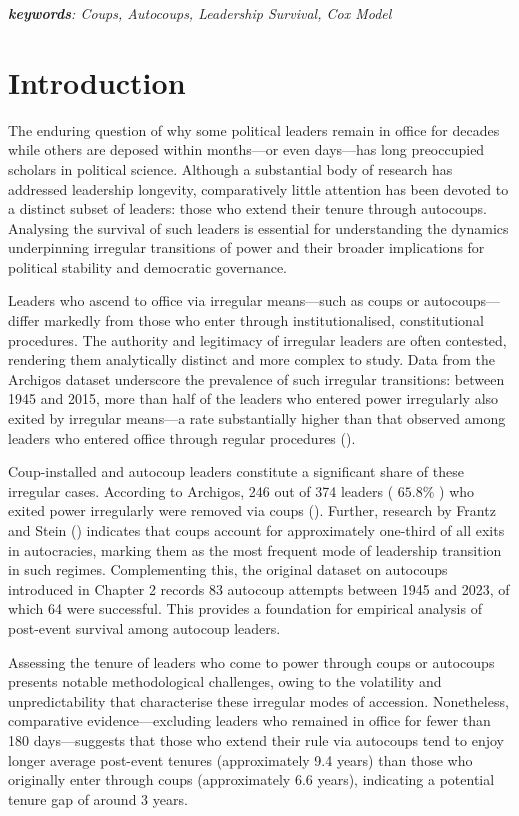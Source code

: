 \documentclass[
  12pt,
]{report}
\begin{document}
\emph{\textbf{keywords}: Coups, Autocoups, Leadership Survival, Cox
Model}

\newpage

\section{Introduction}\label{introduction-3}

The enduring question of why some political leaders remain in office for
decades while others are deposed within months---or even days---has long
preoccupied scholars in political science. Although a substantial body
of research has addressed leadership longevity, comparatively little
attention has been devoted to a distinct subset of leaders: those who
extend their tenure through autocoups. Analysing the survival of such
leaders is essential for understanding the dynamics underpinning
irregular transitions of power and their broader implications for
political stability and democratic governance.

Leaders who ascend to office via irregular means---such as coups or
autocoups---differ markedly from those who enter through
institutionalised, constitutional procedures. The authority and
legitimacy of irregular leaders are often contested, rendering them
analytically distinct and more complex to study. Data from the Archigos
dataset underscore the prevalence of such irregular transitions: between
1945 and 2015, more than half of the leaders who entered power
irregularly also exited by irregular means---a rate substantially higher
than that observed among leaders who entered office through regular
procedures ().

Coup-installed and autocoup leaders constitute a significant share of
these irregular cases. According to Archigos, 246 out of 374 leaders (
\(65.8\%\) ) who exited power irregularly were removed via coups
().
Further, research by Frantz and Stein ()
indicates that coups account for approximately one-third of all exits in
autocracies, marking them as the most frequent mode of leadership
transition in such regimes. Complementing this, the original dataset on
autocoups introduced in Chapter 2 records 83 autocoup attempts between
1945 and 2023, of which 64 were successful. This provides a foundation
for empirical analysis of post-event survival among autocoup leaders.

Assessing the tenure of leaders who come to power through coups or
autocoups presents notable methodological challenges, owing to the
volatility and unpredictability that characterise these irregular modes
of accession. Nonetheless, comparative evidence---excluding leaders who
remained in office for fewer than 180 days---suggests that those who
extend their rule via autocoups tend to enjoy longer average post-event
tenures (approximately 9.4 years) than those who originally enter
through coups (approximately 6.6 years), indicating a potential tenure
gap of around 3 years.
\end{document}
